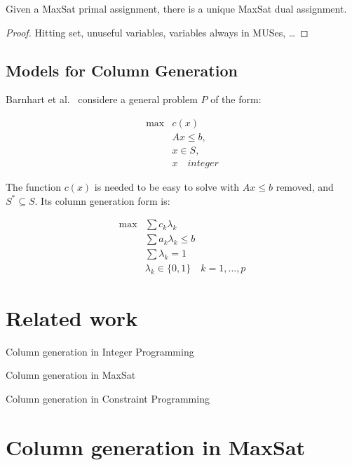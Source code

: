 \documentclass[runningheads,a4paper]{llncs}
\begin{document}

\begin{lemma}
Given a MaxSat primal assignment, there is a unique MaxSat dual assignment.
\end{lemma}
\begin{proof}
Hitting set, unuseful variables, variables always in MUSes, \dots \cite{KLM09}
\end{proof}


\subsection{Models for Column Generation}

Barnhart et al.~\cite{bjnsv98} considere a general problem $P$ of the
form:

\begin{displaymath}
\begin{array}{rl}
\max & c(x) \\
& Ax \le b, \\
& x \in S,\\
& x \quad integer
\end{array}
\end{displaymath}

The function $c(x)$ is needed to be easy to solve with $Ax \le b$
removed, and $S^* \subseteq S $.
Its column generation form is:

\begin{displaymath}
\begin{array}{rl}
\max & \sum c_k \lambda_k \\
& \sum a_k \lambda_k \le b \\
& \sum \lambda_k = 1 \\
& \lambda_k \in \{ 0, 1 \} \quad k=1,\ldots,p
\end{array}
\end{displaymath}

\section{Related work}

Column generation in Integer Programming~\cite{bjnsv98,vw96}

Column generation in MaxSat~\cite{hjp98}

Column generation in Constraint Programming~\cite{FJKKSV02}


\section{Column generation in MaxSat}
\end{document}

